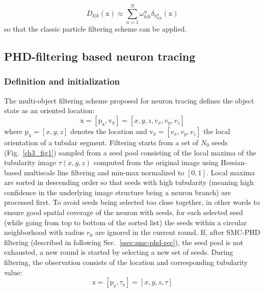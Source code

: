 \begin{equation}
\label{eq:smc-approx}
D_{k|k}(\mathrm{x}) \approx \sum\limits_{n=1}^{N} \omega_{k|k}^{n} \delta_{\mathrm{x}_{k|k}^{n}}\!(\mathrm{x})
\end{equation}
so that the classic particle filtering scheme \cite{doucet2000sequential, arulampalam2002tutorial, ristic2004beyond} can be applied.

\subsection{PHD-filtering based neuron tracing}
\label{ssec:proposed-neur-trac-meth}
\subsubsection{Definition and initialization}
\label{sssec:initialization}
The multi-object filtering scheme proposed for neuron tracing defines the object state as an oriented location:
\begin{equation}
\mathrm{x} = \left[ \mathrm{p}_{\mathrm{x}}, \mathrm{v}_{\mathrm{x}} \right] = \left[x, y, z, v_x, v_y, v_z\right] 
\label{eq:obj-state}
\end{equation}
where $\mathrm{p}_{\mathrm{x}}=[x, y, z]$ denotes the location and $\mathrm{v}_{\mathrm{x}}=[v_x, v_y, v_z]$ the local orientation of a tubular segment. Filtering starts from a set of $N_0$ seeds (Fig.~\ref{ch3_fig1}) sampled from a seed pool consisting of the local maxima of the tubularity image $\tau(x,y,z)$ computed from the original image using Hessian-based multiscale line filtering \cite{sato1998three} and min-max normalized to $[0,1]$. Local maxima are sorted in descending order so that seeds with high tubularity (meaning high confidence in the underlying image structure being a neuron branch) are processed first. To avoid seeds being selected too close together, in other words to ensure good spatial coverage of the neuron with seeds, for each selected seed (while going from top to bottom of the sorted list) the seeds within a circular neighborhood with radius $r_0$ are ignored in the current round. If, after SMC-PHD filtering (described in following Sec.~\ref{ssec:smc-phd-rec}), the seed pool is not exhausted, a new round is started by selecting a new set of seeds. During filtering, the observation consists of the location and corresponding tubularity value:
\begin{equation}
\mathrm{z} = \left[ \mathrm{p}_{\mathrm{z}}, \tau_{\mathrm{z}} \right] = \left[x, y, z, \tau\right]
\label{eq:observation}
\end{equation}
